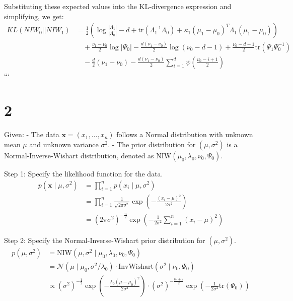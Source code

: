 \documentclass[11pt]{article}
\begin{document}
    Substituting these expected values into the KL-divergence expression and simplifying, we get:
    \begin{align*}
        KL(NIW_0 || NIW_1) &= \frac{1}{2} \left(\log \frac{|\Lambda_1|}{|\Lambda_0|} - d + \text{tr}(\Lambda_1^{-1} \Lambda_0) + \kappa_1 (\mu_1 - \mu_0)^T \Lambda_1 (\mu_1 - \mu_0)\right) \\
        &\quad + \frac{\nu_1 - \nu_0}{2} \log |\Psi_0| - \frac{d(\nu_1 - \nu_0)}{2} \log(\nu_0 - d - 1) + \frac{\nu_0 - d - 1}{2} \text{tr}(\Psi_1 \Psi_0^{-1}) \\
        &\quad - \frac{d}{2} (\nu_1 - \nu_0) - \frac{d(\nu_1 - \nu_0)}{2} \sum_{i=1}^d \psi\left(\frac{\nu_0 - i + 1}{2}\right)
    \end{align*}
    ```


    \section{2}
    Given:
    - The data $\mathbf{x} = (x_1, \ldots, x_n)$ follows a Normal distribution with unknown mean $\mu$ and unknown variance $\sigma^2$.
    - The prior distribution for $(\mu, \sigma^2)$ is a Normal-Inverse-Wishart distribution, denoted as $\text{NIW}(\mu_0, \lambda_0, \nu_0, \Psi_0)$.

    Step 1: Specify the likelihood function for the data.
    \begin{align*}
        p(\mathbf{x} \mid \mu, \sigma^2) &= \prod_{i=1}^n p(x_i \mid \mu, \sigma^2) \\
        &= \prod_{i=1}^n \frac{1}{\sqrt{2\pi\sigma^2}} \exp\left(-\frac{(x_i - \mu)^2}{2\sigma^2}\right) \\
        &= (2\pi\sigma^2)^{-\frac{n}{2}} \exp\left(-\frac{1}{2\sigma^2} \sum_{i=1}^n (x_i - \mu)^2\right)
    \end{align*}

    Step 2: Specify the Normal-Inverse-Wishart prior distribution for $(\mu, \sigma^2)$.
    \begin{align*}
        p(\mu, \sigma^2) &= \text{NIW}(\mu, \sigma^2 \mid \mu_0, \lambda_0, \nu_0, \Psi_0) \\
        &= \mathcal{N}(\mu \mid \mu_0, \sigma^2/\lambda_0) \cdot \text{InvWishart}(\sigma^2 \mid \nu_0, \Psi_0) \\
        &\propto (\sigma^2)^{-\frac{1}{2}} \exp\left(-\frac{\lambda_0(\mu - \mu_0)^2}{2\sigma^2}\right) \cdot (\sigma^2)^{-\frac{\nu_0+2}{2}} \exp\left(-\frac{1}{2\sigma^2}\text{tr}(\Psi_0)\right)
    \end{align*}
\end{document}
